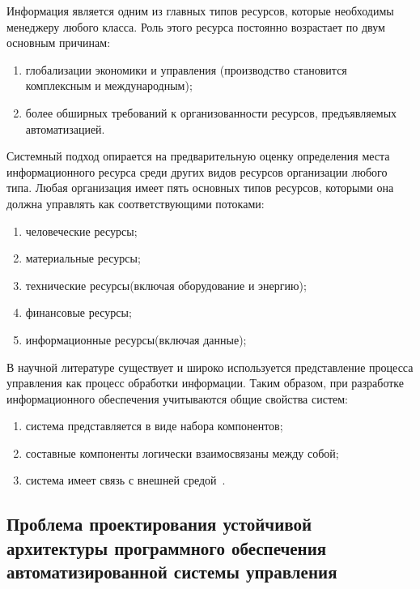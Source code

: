 Информация является одним из главных типов ресурсов, которые необходимы менеджеру любого класса. Роль этого ресурса постоянно возрастает по двум основным причинам:
\begin{enumerate}
    \item  глобализации экономики и управления (производство становится комплексным и международным);
    \item  более обширных требований к организованности ресурсов, предъявляемых автоматизацией.
\end{enumerate}

Системный подход опирается на предварительную оценку определения места информационного ресурса среди других видов ресурсов организации любого типа.
Любая организация имеет пять основных типов ресурсов, которыми она должна управлять как соответствующими потоками:
 \begin{enumerate}
    \item  человеческие ресурсы;
    \item  материальные ресурсы;
    \item  технические ресурсы(включая оборудование и энергию);
    \item  финансовые ресурсы;
    \item  информационные ресурсы(включая данные);
\end{enumerate}
В научной литературе существует и широко используется представление процесса управления как процесс обработки информации. Таким образом, при разработке информационного обеспечения учитываются общие свойства систем:
\begin{enumerate}
    \item  система представляется в виде набора компонентов;
    \item  составные компоненты логически взаимосвязаны между собой;
    \item  система имеет связь с внешней средой~\cite{Ref25, Ref26, Ref27, Ref28,Ref29,Ref30,Ref31, Ref32, Ref33, Ref34,Ref35,Ref36}.
\end{enumerate}


\subsection{Проблема проектирования устойчивой архитектуры программного обеспечения автоматизированной системы управления}\label{subsec:ch1/sec4/sub1}

